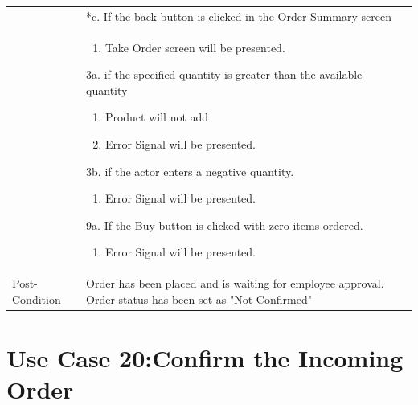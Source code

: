 \documentclass[12pt,a4paper]{report}
\begin{document}
\begin{tabular}{ | m{3cm} | m{12cm}| } \hline
& *c. If the back button is clicked in the Order Summary screen\\

& \begin{enumerate}

		\item Take Order screen will be presented.

	\end{enumerate}

3a. if the specified quantity is greater than the available quantity

 	\begin{enumerate}

		\item Product will not add

		\item Error Signal will be presented.

	\end{enumerate}

3b. if the actor enters a negative quantity.

 	\begin{enumerate}

		\item Error Signal will be presented.

	\end{enumerate}

9a. If the Buy button is clicked with zero items ordered.

	\begin{enumerate}

		\item Error Signal will be presented.

	\end{enumerate}



\\ \hline

Post-Condition &  Order has been placed and is waiting for employee approval. Order status has been set as "Not Confirmed" \\ \hline

\end{tabular}

\section{Use Case 20:Confirm the Incoming Order}
\end{document}
